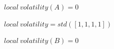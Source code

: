 \documentclass[oneside,12pt]{Classes/RoboticsLaTeX}
\begin{document}
\begin{appendices}
\begin{center}
$local\ volatility(A) = 0$

$local\ volatility = std([1,1,1,1])$

$local\ volatility(B) = 0$
\end{center}







\end{appendices}

\end{document}
